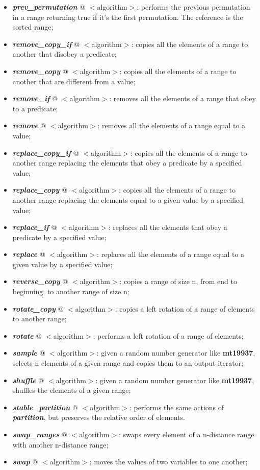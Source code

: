 \documentclass[10pt]{article}
\begin{document}
\begin{multicols*}{4}
{\begin{itemize}[leftmargin=*,topsep=0.25pt]
	\item  \emph{\textbf{prev\_permutation}} @ $<$algorithm$>$: performs the previous permutation in a range returning true if it's the first permutation. The reference is the sorted range;
	\item  \emph{\textbf{remove\_copy\_if}} @ $<$algorithm$>$: copies all the elements of a range to another that disobey a predicate; 
	\item  \emph{\textbf{remove\_copy}} @ $<$algorithm$>$: copies all the elements of a range to another that are different from a value;
	\item  \emph{\textbf{remove\_if}} @ $<$algorithm$>$: removes all the elements of a range that obey to a predicate; 
	\item  \emph{\textbf{remove}} @ $<$algorithm$>$: removes all the elements of a range equal to a value;
	\item  \emph{\textbf{replace\_copy\_if}} @ $<$algorithm$>$: copies all the elements of a range to another range replacing the elements that obey a predicate by a specified value;
	\item  \emph{\textbf{replace\_copy}} @ $<$algorithm$>$: copies all the elements of a range to another range replacing the elements equal to a given value by a specified value;
	\item  \emph{\textbf{replace\_if}} @ $<$algorithm$>$: replaces all the elements that obey a predicate by a specified value;
	\item  \emph{\textbf{replace}} @ $<$algorithm$>$: replaces all the elements of a range equal to a given value by a specified value;
	\item  \emph{\textbf{reverse\_copy}} @ $<$algorithm$>$: copies a range of size n, from end to beginning, to another range of size n;
	\item  \emph{\textbf{rotate\_copy}} @ $<$algorithm$>$: copies a left rotation of a range of elements to another range;
	\item  \emph{\textbf{rotate}} @ $<$algorithm$>$: performs a left rotation of a range of elements;
	\item  \emph{\textbf{sample}} @ $<$algorithm$>$: given a random number generator like {\textbf{mt19937}}, selects n elements of a given range and copies them to an output iterator;
	\item  \emph{\textbf{shuffle}} @ $<$algorithm$>$: given a random number generator like {\textbf{mt19937}}, shuffles the elements of a given range;
	\item  \emph{\textbf{stable\_partition}} @ $<$algorithm$>$: performs the same actions of  \emph{\textbf{partition}}, but preserves the relative order of elements. 
	\item  \emph{\textbf{swap\_ranges}} @ $<$algorithm$>$: swaps every element of a n-distance range with another n-distance range;
	\item  \emph{\textbf{swap}} @ $<$algorithm$>$: moves the values of two variables to one another;
\end{itemize}

}
\end{multicols*}
\end{document}
